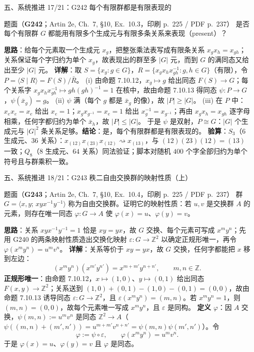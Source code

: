 \documentclass[aspectratio=169,10pt,fontset=none]{ctexbeamer}
\newcommand{\ex}[1]{\textcolor{accent}{\footnotesize\bfseries #1}}
\newcommand{\key}[1]{\textcolor{ink}{\bfseries #1}}
\begin{document}
\begin{frame}[t]{五、系统推进 17/21：G242 每个有限群都是有限表现的}
\label{ex:G242}
\scriptsize
\begin{block}{\footnotesize 题面（\ex{G242}；Artin 2e, Ch.~7, \S10, Ex.~10.3，印刷 p.~225 / PDF p.~237）}
是否每个有限群 $G$ 都能用有限多个生成元与有限多条关系来表现（present）？
\end{block}
\key{思路}：给每个元素取一个生成元 $x_g$，把整张乘法表写成有限条关系 $x_gx_h=x_{gh}$；关系保证每个字归约为单个 $x_g$，故表现出的群至多 $|G|$ 元，而到 $G$ 的满同态又给出至少 $|G|$ 元。
\key{详解}：取 $S=\{x_g:g\in G\}$，$R=\{x_gx_hx_{gh}^{-1}:g,h\in G\}$（有限），令 $P=\langle S\mid R\rangle=F(S)/\bar R$。
(i) 由命题 7.10.12，$x_g\mapsto g$ 给出同态 $F(S)\to G$；每个关系字 $x_gx_hx_{gh}^{-1}\mapsto gh(gh)^{-1}=1$ 在核中，故由命题 7.10.13 得同态 $\psi:P\to G$，$\psi(\bar x_g)=g$。
(ii) $\psi$ 满（每个 $g$ 都是 $\bar x_g$ 的像），故 $|P|\ge|G|$。
(iii) 在 $P$ 中：$x_ex_e=x_e$ 给出 $x_e=1$；$x_gx_{g^{-1}}=x_e=1$ 给出 $x_g^{-1}=x_{g^{-1}}$；再由 $x_gx_h=x_{gh}$ 逐字母相乘，任何字都归约为单个 $\bar x_h$，故 $|P|\le|G|$。
于是 $\psi$ 是双射，$P\cong G$：$|G|$ 个生成元与 $|G|^2$ 条关系足够。\key{结论}：是，每个有限群都是有限表现的。
\key{验算}：$S_3$（$6$ 生成元、$36$ 关系）：$x_{(12)}x_{(23)}x_{(12)}\rightsquigarrow x_{(13)}$，与 $(12)(23)(12)=(13)$ 一致；$Q_8$（$8$ 生成元、$64$ 关系）同法验证；脚本对随机 $400$ 个字全部归约为单个符号且与群乘积一致。
\end{frame}

\begin{frame}[t]{五、系统推进 18/21：G243 秩二自由交换群的映射性质（上）}
\label{ex:G243}
\scriptsize
\begin{block}{\footnotesize 题面（\ex{G243}；Artin 2e, Ch.~7, \S10, Ex.~10.4，印刷 p.~225 / PDF p.~237）}
群 $G=\langle x,y;\,xyx^{-1}y^{-1}\rangle$ 称为自由交换群。证明它的映射性质：若 $u,v$ 是交换群 $A$ 的元素，则存在唯一同态 $\varphi:G\to A$ 使 $\varphi(x)=u$、$\varphi(y)=v$。
\end{block}
\key{思路}：关系 $xyx^{-1}y^{-1}=1$ 恰是 $xy=yx$，故 $G$ 交换、每个元素可写成 $x^my^n$；先用 G240 的两条映射性质造出交换化映射 $\varepsilon:G\to\mathbb Z^2$ 以确定正规形唯一，再令 $\varphi(x^my^n)=u^mv^n$。
\key{详解}：关系等价于 $xy=yx$，故 $G$ 交换，任何字都能把 $x$ 移到左边：
\[ (x^my^n)(x^{m'}y^{n'})=x^{m+m'}y^{n+n'},\qquad m,n\in\mathbb Z. \]
\textbf{正规形唯一}：由命题 7.10.12，$x\mapsto(1,0)$、$y\mapsto(0,1)$ 给出同态 $F(x,y)\to\mathbb Z^2$；关系送到 $(1,0)+(0,1)-(1,0)-(0,1)=(0,0)$，故由命题 7.10.13 诱导同态 $\varepsilon:G\to\mathbb Z^2$，且 $\varepsilon(x^my^n)=(m,n)$。若 $x^my^n=1$，则 $(m,n)=(0,0)$，故每个元素唯一写成 $x^my^n$，且 $\varepsilon$ 是同构。
\textbf{定义 $\varphi$}：因 $A$ 交换，$\psi(m,n):=u^mv^n$ 是同态 $\mathbb Z^2\to A$（$\psi((m,n)+(m',n'))=u^{m+m'}v^{n+n'}=\psi(m,n)\psi(m',n')$）。令
\[ \varphi:=\psi\circ\varepsilon,\qquad \varphi(x^my^n)=u^mv^n. \]
于是 $\varphi(x)=u$、$\varphi(y)=v$ 且 $\varphi$ 是同态。
\end{frame}
\end{document}
